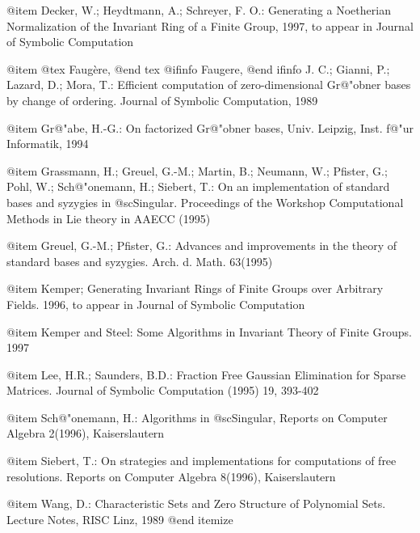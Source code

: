 @item
Decker, W.; Heydtmann, A.; Schreyer, F. O.: Generating a Noetherian Normalization of
the Invariant Ring of a Finite Group, 1997, to appear in Journal of
Symbolic Computation

@item
@tex
Faug\`ere,
@end tex
@ifinfo
Faugere,
@end ifinfo
J. C.; Gianni, P.; Lazard, D.; Mora, T.: Efficient computation
of zero-dimensional
Gr@"obner bases by change of ordering. Journal of Symbolic Computation, 1989

@item
Gr@"abe, H.-G.: On factorized Gr@"obner bases, Univ. Leipzig, Inst. f@"ur
Informatik, 1994

@item
Grassmann, H.; Greuel, G.-M.; Martin, B.; Neumann,
W.; Pfister, G.; Pohl, W.; Sch@"onemann, H.; Siebert, T.:  On an
implementation of standard bases and syzygies in  @sc{Singular}.
Proceedings of the Workshop  Computational Methods in Lie theory in AAECC (1995)

@item
Greuel, G.-M.; Pfister, G.:
Advances and improvements in the theory of standard bases and
syzygies. Arch. d. Math. 63(1995)

@item
Kemper; Generating Invariant Rings of Finite Groups over Arbitrary
Fields. 1996, to appear in Journal of Symbolic Computation

@item
Kemper and Steel: Some Algorithms in Invariant Theory of Finite Groups. 1997

@item
Lee, H.R.; Saunders, B.D.: Fraction Free Gaussian Elimination for
Sparse Matrices. Journal of Symbolic Computation (1995) 19, 393-402

@item
Sch@"onemann, H.:
Algorithms in @sc{Singular},
Reports on Computer Algebra 2(1996), Kaiserslautern

@item
Siebert, T.:
On strategies and implementations for computations of free resolutions.
Reports on Computer Algebra 8(1996), Kaiserslautern

@item
Wang, D.:
Characteristic Sets and Zero Structure of Polynomial Sets.
Lecture Notes, RISC Linz, 1989
@end itemize

